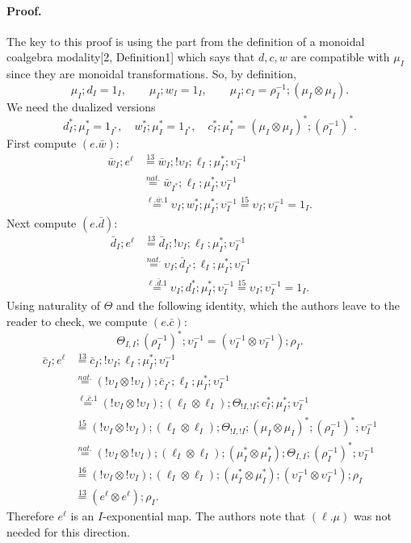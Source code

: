 \documentclass[10pt,a4paper]{amsart}
\newcommand{\by}[1]{\overset{\scriptscriptstyle #1}{=}}
\begin{document}
\paragraph{Proof.}
The key to this proof is using the part from the definition of a monoidal coalgebra
modality[2, Definition1] which says that $d,c,w$ are compatible with $\mu_I$
since they are monoidal transformations. So, by definition,
\begin{equation}
\mu_I;d_I=1_I,\qquad \mu_I;w_I=1_I,\qquad
\mu_I;c_I=\rho_I^{-1};(\mu_I\otimes\mu_I).\tag{14}
\end{equation}
We need the dualized versions
\begin{equation}
d_I^*;\mu_I^*=1_{I^*},\quad
w_I^*;\mu_I^*=1_{I^*},\quad
c_I^*;\mu_I^*=(\mu_I\otimes\mu_I)^*;(\rho_I^{-1})^*.\tag{15}
\end{equation}
First compute $(e.\bar w)$:
\begin{align*}
\bar w_I;e^\ell
&\by{13}\bar w_I;!\upsilon_I;\ell_I;\mu_I^*;\upsilon_I^{-1}\\
&\by{nat.}\bar w_{I^*};\ell_I;\mu_I^*;\upsilon_I^{-1}\\
&\by{\ell.\bar w.1}\upsilon_I;w_I^*;\mu_I^*;\upsilon_I^{-1}
\by{15}\upsilon_I;\upsilon_I^{-1}=1_I.
\end{align*}
Next compute $(e.\bar d)$:
\begin{align*}
\bar d_I;e^\ell
&\by{13}\bar d_I;!\upsilon_I;\ell_I;\mu_I^*;\upsilon_I^{-1}\\
&\by{nat.}\upsilon_I;\bar d_{I^*};\ell_I;\mu_I^*;\upsilon_I^{-1}\\
&\by{\ell.\bar d.1}\upsilon_I;d_I^*;\mu_I^*;\upsilon_I^{-1}
\by{15}\upsilon_I;\upsilon_I^{-1}=1_I.
\end{align*}
Using naturality of $\Theta$ and the following identity, which the authors
leave to the reader to check, we compute $(e.\bar c)$:
\begin{equation}
\Theta_{I,I};(\rho_I^{-1})^*;\upsilon_I^{-1}
=(\upsilon_I^{-1}\otimes\upsilon_I^{-1});\rho_I.\tag{16}
\end{equation}
\begin{align*}
\bar c_I;e^\ell
&\by{13}\bar c_I;!\upsilon_I;\ell_I;\mu_I^*;\upsilon_I^{-1}\\
&\by{nat.}(!\upsilon_I\otimes!\upsilon_I);\bar c_{I^*};\ell_I;\mu_I^*;\upsilon_I^{-1}\\
&\by{\ell.\bar c.1}(!\upsilon_I\otimes!\upsilon_I);(\ell_I\otimes\ell_I);
\Theta_{!I,!I};c_I^*;\mu_I^*;\upsilon_I^{-1}\\
&\by{15}(!\upsilon_I\otimes!\upsilon_I);(\ell_I\otimes\ell_I);
\Theta_{!I,!I};(\mu_I\otimes\mu_I)^*;(\rho_I^{-1})^*;\upsilon_I^{-1}\\
&\by{nat.}(!\upsilon_I\otimes!\upsilon_I);(\ell_I\otimes\ell_I);
(\mu_I^*\otimes\mu_I^*);\Theta_{I,I};(\rho_I^{-1})^*;\upsilon_I^{-1}\\
&\by{16}(!\upsilon_I\otimes!\upsilon_I);(\ell_I\otimes\ell_I);
(\mu_I^*\otimes\mu_I^*);(\upsilon_I^{-1}\otimes\upsilon_I^{-1});\rho_I\\
&\by{13}(e^\ell\otimes e^\ell);\rho_I.
\end{align*}
Therefore $e^\ell$ is an $I$-exponential map. The authors note that
$(\ell.\mu)$ was not needed for this direction.
\end{document}
